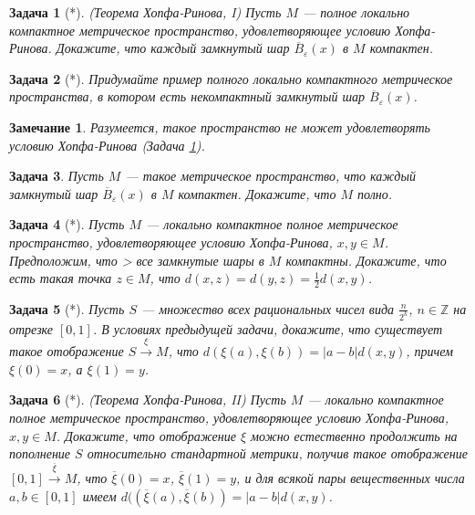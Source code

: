\documentclass[12pt]{book}
\renewcommand{\epsilon}{\varepsilon}
\def\Z{{\mathbb Z}}
\theoremstyle{upshape}
\newtheorem{zadacha}{Задача}[chapter]
\theoremstyle{generic}
\newtheorem{remark}[teorema]{Замечание}
\def\замечание{\begin{remark}}
\def\еза{\end{remark}}
\theoremstyle{upshapenonumber}
\newcommand{\следствие}{%
     \refstepcounter{teorema}
     {\noindent\bf Следствие \thechapter.\arabic{teorema}:\ }}
\newcommand{\пример}{%
     \refstepcounter{teorema}
     {\noindent\bf Пример \thechapter.\arabic{teorema}:\ }}
\newcommand{\лемма}{%
     \refstepcounter{teorema}
     {\noindent\bf Лемма \thechapter.\arabic{teorema}:\ }}
\newcommand{\теорема}{%
     \refstepcounter{teorema}
     {\noindent\bf Теорема \thechapter.\arabic{teorema}:\ }}
\newcommand{\утверждение}{%
     \refstepcounter{teorema}
     {\noindent\bf Утверждение \thechapter.\arabic{teorema}:\ }}
\def\ем{\em}
\def\задача{\begin{zadacha}}
\def\ез{\end{zadacha}}
\def\еу{\end{ukazanie}}
\def\ео{\end{opredelenie}}
\def\енум{\begin{enumerate}}
\def\ее{\end{enumerate}}
\begin{document}
{\begin{zadacha}[*] \label{_Hopf_Rinow_1_Zadacha_}
(Теорема Хопфа-Ринова, I)
Пусть $M$ --- полное локально компактное метрическое пространство,
удовлетворяющее условию Хопфа-Ринова. Докажите, что каждый замкнутый
шар $\overline B_{\epsilon}(x)$ в $M$ компактен.
\end{zadacha}


\begin{zadacha}[*]
Придумайте пример полного 
локально компактного метрическое пространства, в котором
есть некомпактный замкнутый шар $\overline B_{\epsilon}(x)$.
\end{zadacha}

\замечание
Разумеется, такое пространство не может 
удовлетворять условию Хопфа-Ринова (Задача \ref{_Hopf_Rinow_1_Zadacha_}).
\еза


\begin{zadacha} Пусть $M$ --- такое метрическое пространство, что
каждый замкнутый шар $\overline B_{\epsilon}(x)$ в $M$
компактен. Докажите, что $M$ полно.
\end{zadacha}

\begin{zadacha}[*] Пусть $M$ --- локально компактное
полное метрическое пространство, удовлетворяющее условию
Хопфа-Ринова, $x, y\in M$. Предположим, что
> все замкнутые шары в $M$ компактны. Докажите, что есть такая точка $z\in M$,
что $d(x,z) = d (y, z)= \frac 1 2 d(x,y)$.
\end{zadacha}

\begin{zadacha}[*] Пусть $S$ --- множество всех рациональных 
чисел вида $\frac{n}{2^k}$, $n\in \Z$ на отрезке $[0,1]$. В условиях
предыдущей задачи, докажите, что существует такое отображение
$S\overset \xi\to M$, что $d(\xi(a), \xi(b)) = |a-b| d(x,y)$,
причем $\xi(0)=x$, а $\xi(1)=y$.
\end{zadacha}

\begin{zadacha}[*] (Теорема Хопфа-Ринова, II)
Пусть $M$ --- локально компактное полное метрическое пространство,
удовлетворяющее условию Хопфа-Ринова, $x, y\in M$. Докажите, что
отображение $\xi$ можно естественно продолжить на пополнение $S$
относительно стандартной метрики, получив такое отображение
$[0,1]\overset {\overline\xi}\to M$, что $\overline\xi(0)=x$,
$\overline\xi(1)=y$, и для всякой пары вещественных числа $a,b\in
[0,1]$ имеем $d((\overline\xi(a), \overline\xi(b)) = |a-b| d(x,y)$.
\end{zadacha}

}
\end{document}

